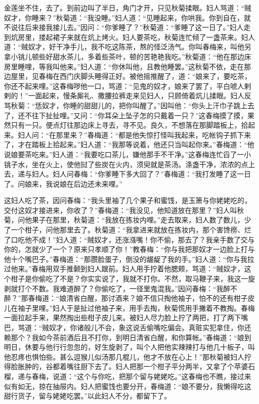 金莲坐不住，去了。到前边叫了半日，角门才开，只见秋菊揉眼。妇人骂道：“贼奴才，你睡来？”秋菊道：“我没睡。”妇人道：“见睡起来，你哄我。你到自在，就不说往后来接我接儿去。”因问：“你爹睡了？”秋菊道：“爹睡了这一日了。”妇人走到炕房里，搂起裙子来就在炕上烤火。妇人要茶吃，秋菊连忙倾了一盏茶来。妇人道：“贼奴才，好干净手儿，我不吃这陈茶，熬的怪泛汤气。你叫春梅来，叫他另拿小铫儿顿些好甜水茶儿，多着些茶叶，顿的苦艳艳我吃。”秋菊道：“他在那边床房里睡哩，等我叫他来。”妇人道：“你休叫他，且教他睡罢。”这秋菊不依，走在那边屋里，见春梅\textShouWai 在西门庆脚头睡得正好。被他摇推醒了，道：“娘来了，要吃茶，你还不起来哩。”这春梅哕他一口，骂道：“见鬼的奴才，娘来了罢了，平白唬人剌剌的！”一面起来，慢条厮礼、撒腰拉裤走来见妇人，只顾倚着炕儿揉眼。妇人反骂秋菊：“恁奴才，你睡的甜甜儿的，把你叫醒了。”因叫他：“你头上汗巾子跳上去了，还不往下扯扯哩。”又问：“你耳朵上坠子怎的只戴着一只？”这春梅摸了摸，果然只有一只。便点灯往那边床上寻去，寻不见。良久，不想落在那脚踏板上，拾起来。妇人问：“在那里来？”春梅道：“都是他失惊打怪叫我起来，吃帐钩子抓下来了，才在踏板上拾起来。”妇人道：“我那等说着，他还只当叫起你来。”春梅道：“他说娘要茶吃来。”妇人道：“我要吃口茶儿，嫌他那手不干净。”这春梅连忙舀了一小铫子水，坐在火上，使他挝了些炭在火内，须臾就是茶汤。涤盏干净，浓浓的点上去，递与妇人。妇人问春梅：“你爹睡下多大回了？”春梅道：“我打发睡了这一日了。问娘来，我说娘在后边还未来哩。”

这妇人吃了茶，因问春梅：“我头里袖了几个果子和蜜饯，是玉箫与你姥姥吃的，交付这奴才接进来，你收了？”春梅道：“我没见，他知道放在那里？”妇人叫秋菊，问他果子在那里，秋菊道：“我放在拣妆内哩。”走去取来，妇人数了数儿，少了一个柑子，问他那里去了。秋菊道：“我拿进来就放在拣妆内，那个害馋痨、烂了口吃他不成！”妇人道：“贼奴才，还涨漒嘴！你不偷，那去了？我亲手数了交与你的，怎就少了一个？原来只孝顺了你！”教春梅：“你与我把那奴才一边脸上打与他十个嘴巴子。”春梅道：“那臜脸蛋子，倒没的龌龊了我的手。”妇人道：“你与我拉过他来。”春梅用双手推颡到妇人跟前。妇人用手拧着他腮颊，骂道：“贼奴才，这个柑子是你偷吃了不是？你实实说了，我就不打你。不然，取马鞭子来，我这一旋剥就打个不数。我难道醉了？你偷吃了，一径里鬼混我。”因问春梅：“我醉不醉？”那春梅道：“娘清省白醒，那讨酒来？娘不信只掏他袖子，怕不的还有柑子皮儿在袖子里哩。”妇人于是扯过他袖子来，用手去掏，秋菊慌用手撇着不教掏。春梅一面拉起手来，果然掏出些柑子皮儿来。被妇人尽力脸上拧了两把，打了两下嘴巴，骂道：“贼奴才，你诸般儿不会，象这说舌偷嘴吃偏会。真赃实犯拿住，你还赖那个？我如今茶前酒后且不打你，到明日清省白醒，和你算帐。”春梅道：“娘到明日，休要与他行行忽忽的，好生旋剥了，叫个人把他实辣辣打与他几十板子，叫他忍疼也惧怕些。甚么逗猴儿似汤那几棍儿，他才不放在心上！”那秋菊被妇人拧得脸胀肿的，谷都着嘴往厨下去了。妇人把那一个柑子平分两半，又拿了个苹婆石榴，递与春梅，说道：“这个与你吃，把那个留与姥姥吃。”这春梅也不瞧，接过来似有如无，掠在抽屉内。妇人把蜜饯也要分开，春梅道：“娘不要分，我懒得吃这甜行货子，留与姥姥吃罢。”以此妇人不分，都留下了。

